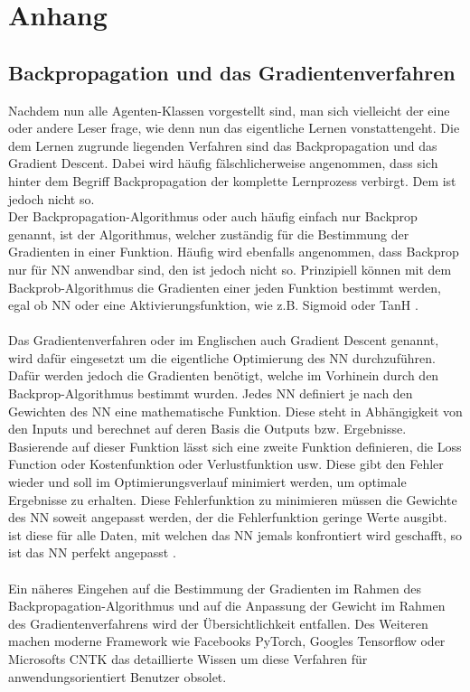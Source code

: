\chapter{Anhang}

\section{Backpropagation und das Gradientenverfahren} \label{Backprop_GD}
Nachdem nun alle Agenten-Klassen vorgestellt sind, man sich vielleicht der eine oder andere Leser frage, wie denn nun das eigentliche Lernen vonstattengeht. Die dem Lernen zugrunde liegenden Verfahren sind das Backpropagation und das Gradient Descent. Dabei wird häufig fälschlicherweise angenommen, dass sich hinter dem Begriff Backpropagation der komplette Lernprozess verbirgt. Dem ist jedoch nicht so.\\
Der Backpropagation-Algorithmus oder auch häufig einfach nur Backprop genannt, ist der Algorithmus, welcher zuständig für die Bestimmung der Gradienten in einer Funktion. Häufig wird ebenfalls angenommen, dass Backprop nur für NN anwendbar sind, den ist jedoch nicht so. Prinzipiell können mit dem Backprob-Algorithmus die Gradienten einer jeden Funktion bestimmt werden, egal ob NN oder eine Aktivierungsfunktion, wie z.B. Sigmoid oder TanH \cite[S. 90ff.]{DL}.\\
\\Das Gradientenverfahren oder im Englischen auch Gradient Descent genannt, wird dafür eingesetzt um die eigentliche Optimierung des NN durchzuführen. Dafür werden jedoch die Gradienten benötigt, welche im Vorhinein durch den Backprop-Algorithmus bestimmt wurden. Jedes NN definiert je nach den Gewichten des NN eine mathematische Funktion. Diese steht in Abhängigkeit von den Inputs und berechnet auf deren Basis die Outputs bzw. Ergebnisse. Basierende auf dieser Funktion lässt sich eine zweite Funktion definieren, die Loss Function oder Kostenfunktion oder Verlustfunktion usw. Diese gibt den Fehler wieder und soll im Optimierungsverlauf minimiert werden, um optimale Ergebnisse zu erhalten. Diese Fehlerfunktion zu minimieren müssen die Gewichte des NN soweit angepasst werden, der die Fehlerfunktion geringe Werte ausgibt. ist diese für alle Daten, mit welchen das NN jemals konfrontiert wird geschafft, so ist das NN perfekt angepasst \cite[S. 225ff.]{DL}.\\
\\Ein näheres Eingehen auf die Bestimmung der Gradienten im Rahmen des Backpropagation-Algorithmus und auf die Anpassung der Gewicht im Rahmen des Gradientenverfahrens wird der Übersichtlichkeit entfallen. Des Weiteren machen moderne Framework wie Facebooks PyTorch, Googles Tensorflow oder Microsofts CNTK das detaillierte Wissen um diese Verfahren für anwendungsorientiert Benutzer obsolet.

